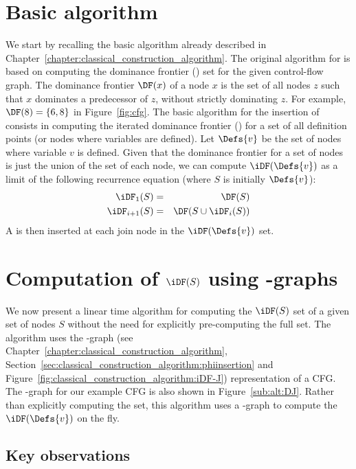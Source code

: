 {\section{Basic algorithm} \label{section:alternative_ssa_construction_algorithms:cytron}
We start by recalling the basic algorithm already described in Chapter~\ref{chapter:classical_construction_algorithm}. 
The original algorithm for  \phifuns is based on computing the dominance frontier (\DF) set for the given control-flow graph. 
The dominance frontier $\DF(x)$ of a node $x$ is the set of all nodes $z$ such that $x$ dominates a predecessor of $z$, without strictly dominating $z$. 
For example, $\DF(8)= \{ 6, 8 \}$ in Figure~\ref{fig:cfg}. 
The basic algorithm for the insertion of \phifuns consists in computing the iterated dominance frontier (\iDF) for a set of all definition points (or nodes where variables are defined). 
Let $\Defs{v}$ be the set of nodes where variable $v$ is defined. 
Given that the dominance frontier for a set of nodes is just the union of the \DF set of each node, we can compute $\iDF(\Defs{v})$ as a limit of the following recurrence equation (where $S$ is initially $\Defs{v}$): \begin{eqnarray*} \iDF_1(S) &=& \DF(S) \\ \iDF_{i+1} (S) &=& \DF(S \cup \iDF_i(S))  \end{eqnarray*}
A \phifun is then inserted at each join node in the  $\iDF(\Defs{v})$ set. 

\section{Computation of $\iDF(S)$ using \DJ-graphs}
\label{section:alternative_ssa_construction_algorithms:sreedhar}
We now present a linear time algorithm for computing the $\iDF(S)$ set of a given set of nodes $S$ without the need for explicitly pre-computing the full \DF set. 
The algorithm uses the \DJ-graph (see Chapter~\ref{chapter:classical_construction_algorithm}, Section~\ref{sec:classical_construction_algorithm:phiinsertion} and Figure~\ref{fig:classical_construction_algorithm:iDF-J}) representation of a CFG. 
The \DJ-graph for our example CFG is also shown in Figure~\ref{sub:alt:DJ}. 
Rather than explicitly computing the \DF set, this algorithm uses a \DJ-graph to compute the $\iDF(\Defs{v})$ on the fly.

\subsection{Key observations} 
 
}
